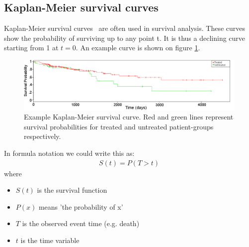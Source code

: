 \subsection{Kaplan-Meier survival curves}
Kaplan-Meier survival curves~\cite{goel2010understanding} are often used in survival analysis. These curves show the probability of surviving up to any point t. It is thus a declining curve starting from 1 at $t=0$. An example curve is shown on figure \ref{fig:cox-example-kaplan-meier}.
\begin{figure}
	\centering
	\includegraphics[scale=0.4]{images/example_kaplan_meier_curve}
	\caption{Example Kaplan-Meier survival curve. Red and green lines represent survival probabilities for treated and untreated patient-groups respectively.}
	\label{fig:cox-example-kaplan-meier}
\end{figure}
In formula notation we could write this as:
\begin{equation}
\begin{split}
S(t) = P(T > t)
\end{split}
\end{equation}
where
\begin{itemize}
	\item $S(t)$ is the survival function
	\item $P(x)$ means 'the probability of x'
	\item $T$ is the observed event time (e.g. death)
	\item $t$ is the time variable
\end{itemize}
